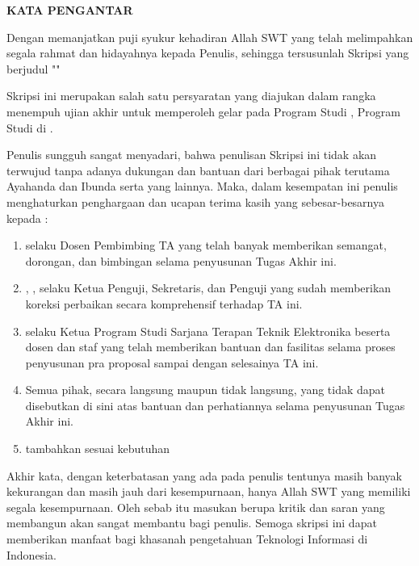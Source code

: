 
\clearpage
{}
{}
\begin{center}
    \textbf{\large KATA PENGANTAR}\\[3em]
\end{center}

Dengan memanjatkan puji syukur kehadiran Allah SWT yang telah melimpahkan segala rahmat dan hidayahnya kepada Penulis, sehingga tersusunlah Skripsi yang berjudul "\textbf{\judulid}"

Skripsi ini merupakan salah satu persyaratan yang diajukan dalam rangka menempuh ujian akhir untuk memperoleh gelar {\gelar} {\gelarsingkat} pada Program Studi {\prodi}, Program Studi {\prodi} di {\fakultas} {\universitas}.

Penulis sungguh sangat menyadari, bahwa penulisan Skripsi ini tidak akan terwujud tanpa adanya dukungan dan bantuan dari berbagai pihak terutama Ayahanda dan Ibunda serta yang lainnya. Maka, dalam kesempatan ini penulis menghaturkan penghargaan dan ucapan terima kasih yang sebesar-besarnya kepada :

\begin{enumerate}
    \item {\pembimbingutama} selaku Dosen Pembimbing TA yang telah banyak memberikan semangat, dorongan, dan bimbingan selama penyusunan Tugas Akhir ini.
    \item {\pembimbingutama}, {\sekretaris}, {\penguji} selaku Ketua Penguji, Sekretaris, dan Penguji yang sudah  memberikan koreksi perbaikan secara komprehensif terhadap TA ini.
    \item {\koorprodi} selaku Ketua Program Studi Sarjana Terapan Teknik Elektronika beserta dosen dan staf yang telah memberikan bantuan dan fasilitas selama proses penyusunan pra proposal sampai dengan selesainya TA ini.
    \item Semua pihak, secara langsung maupun tidak langsung, yang tidak dapat disebutkan di sini atas bantuan dan perhatiannya selama penyusunan Tugas Akhir ini.
    \item tambahkan sesuai kebutuhan
\end{enumerate}

Akhir kata, dengan keterbatasan yang ada pada penulis tentunya masih banyak kekurangan dan masih jauh dari kesempurnaan, hanya Allah SWT yang memiliki segala kesempurnaan. Oleh sebab itu masukan berupa kritik dan saran yang membangun akan sangat membantu bagi penulis. Semoga skripsi ini dapat memberikan manfaat bagi khasanah pengetahuan Teknologi Informasi di Indonesia.

